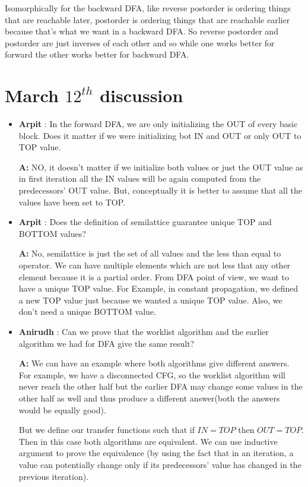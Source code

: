 Isomorphically for the backward DFA, like reverse postorder is ordering things that are reachable later, postorder is ordering things that are reachable earlier because that's what we want in a backward DFA. So reverse postorder and postorder are just inverses of each other and so while one works better for forward the
other works better for backward DFA.






\clearpage
\section{March $12^{th}$ discussion}

\begin{itemize}
    \item \textbf{Arpit} : In the forward DFA, we are only initializing the OUT of every basic block. Does it matter if we were initializing bot IN and OUT or only OUT to TOP value. 

        \textbf{A:} NO, it doesn't matter if we initialize both values or just the OUT value as in first iteration all the IN values will be again computed from the predecessors' OUT value. But, conceptually it is better to assume that all the values have been set to TOP.
    \item \textbf{Arpit} : Does the definition of semilattice guarantee unique TOP and BOTTOM values? 
    
        \textbf{A:} No, semilattice is just the set of all values and the less than equal to operator. We can have multiple elements which are not less that any other element because it is a partial order. From DFA point of view, we want to have a unique TOP value. For Example, in constant propagation, we defined a new TOP value just because we wanted a unique TOP value. Also, we don't need a unique BOTTOM value.

    \item \textbf{Anirudh} : Can we prove that the worklist algorithm and the earlier algorithm we had for DFA give the same result?
    
        \textbf{A:} We can have an example where both algorithms give different answers. For example, we have a disconnected CFG, so the worklist algorithm will never reach the other half but the earlier DFA may change some values in the other half as well and thus produce a different answer(both the answers would be equally good).
        
        But we define our transfer functions such that if $IN=TOP$ then $OUT=TOP$. Then in this case both algorithms are equivalent. We can use inductive argument to prove the equivalence (by using the fact that in an iteration, a value can potentially change only if its predecessors' value has changed in the previous iteration).


\end{itemize}
